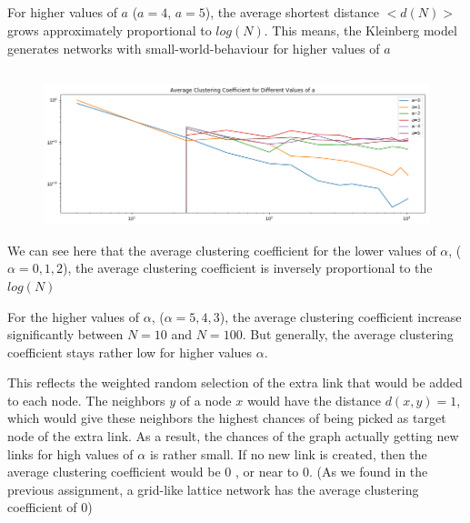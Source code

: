 \documentclass {article}
\begin{document}
\subsection{}
For higher values of $ a $ ($ a=4 $, $ a=5 $), the average shortest distance $ <d(N)> $ grows approximately proportional to $ log(N) $. This means, the Kleinberg model generates networks with small-world-behaviour for higher values of $ a $

\subsection{}
\begin{figure}[h!]
  \includegraphics[width=\linewidth]{img/4.png}
\end{figure}

We can see here that the average clustering coefficient for the lower values of $ \alpha $, ($ \alpha = 0, 1, 2 $), the average clustering coefficient is inversely proportional to the $ log(N) $

For the higher values of $ \alpha $, ($ \alpha = 5, 4, 3 $), the average clustering coefficient increase significantly between $ N=10 $ and $ N=100 $. But generally, the average clustering coefficient stays rather low for higher values $ \alpha $.

This reflects the weighted random selection of the extra link that would be added to each node. The neighbors $ y $ of a node $ x $ would have the distance $ d(x,y)=1 $, which would give these neighbors the highest chances of being picked as target node of the extra link. As a result, the chances of the graph actually getting new links for high values of $ \alpha $ is rather small. If no new link is created, then the average clustering coefficient would be $ 0 $ , or near to $ 0 $. (As we found in the previous assignment, a grid-like lattice network has the average clustering coefficient of $ 0 $)
\end{document}
